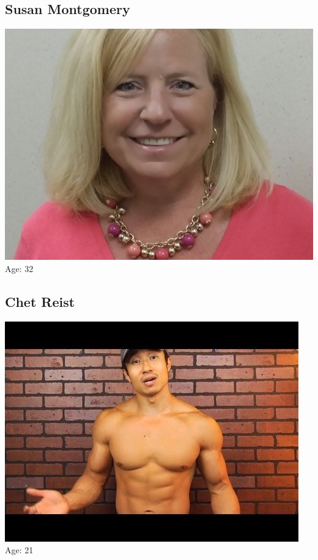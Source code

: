 \documentclass[a4paper,12pt]{article}
\begin{document}
\subsection*{Susan Montgomery}
\includegraphics[scale=0.23]{Susan.jpg}
Age: 32\\
\subsection*{Chet Reist}
\includegraphics[scale=0.38]{Chet.jpg}
Age: 21\\
\end{document}
